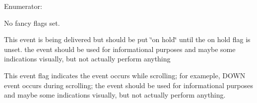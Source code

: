 \begin{Desc}
\item[Enumerator: ]\par
\begin{description}
\item[{\em 
EVAS\_\-EVENT\_\-FLAG\_\-NONE\label{Evas_8h_a89ffbc5f4d2796994c8b07ef95ef3d1aa8c38841674b14dc2b2baec5d97d1f1cf}
}]No fancy flags set. \item[{\em 
EVAS\_\-EVENT\_\-FLAG\_\-ON\_\-HOLD\label{Evas_8h_a89ffbc5f4d2796994c8b07ef95ef3d1aa2370cbd360270536042b7cfd8c7fcd83}
}]This event is being delivered but should be put \char`\"{}on hold\char`\"{} until the on hold flag is unset. the event should be used for informational purposes and maybe some indications visually, but not actually perform anything \item[{\em 
EVAS\_\-EVENT\_\-FLAG\_\-ON\_\-SCROLL\label{Evas_8h_a89ffbc5f4d2796994c8b07ef95ef3d1aa327728e91b3a2c6aa7a3fd9985bee311}
}]This event flag indicates the event occurs while scrolling; for exameple, DOWN event occurs during scrolling; the event should be used for informational purposes and maybe some indications visually, but not actually perform anything. \end{description}
\end{Desc}

